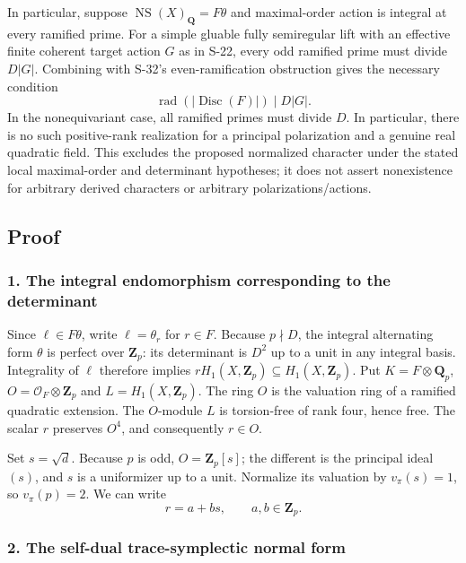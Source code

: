 In particular, suppose \(\operatorname{NS}(X)_{\mathbf Q}=F\theta\) and maximal-order action is integral at every ramified prime. For a simple gluable fully semiregular lift with an effective finite coherent target action \(G\) as in S-22, every odd ramified prime must divide \(D|G|\). Combining with S-32's even-ramification obstruction gives the necessary condition \[
 \operatorname{rad}(|\operatorname{Disc}(F)|)\mid D|G|.
 \tag{S33.4}
\] In the nonequivariant case, all ramified primes must divide \(D\). In particular, there is no such positive-rank realization for a principal polarization and a genuine real quadratic field. This excludes the proposed normalized character under the stated local maximal-order and determinant hypotheses; it does not assert nonexistence for arbitrary derived characters or arbitrary polarizations/actions.

\subsection{Proof}\label{proof}

\subsubsection{1. The integral endomorphism corresponding to the determinant}\label{the-integral-endomorphism-corresponding-to-the-determinant}

Since \(\ell\in F\theta\), write \(\ell=\theta_r\) for \(r\in F\). Because \(p\nmid D\), the integral alternating form \(\theta\) is perfect over \(\mathbf Z_p\): its determinant is \(D^2\) up to a unit in any integral basis. Integrality of \(\ell\) therefore implies \(rH_1(X,\mathbf Z_p)\subseteq H_1(X,\mathbf Z_p)\). Put \(K=F\otimes\mathbf Q_p\), \(O=\mathcal O_F\otimes\mathbf Z_p\) and \(L=H_1(X,\mathbf Z_p)\). The ring \(O\) is the valuation ring of a ramified quadratic extension. The \(O\)-module \(L\) is torsion-free of rank four, hence free. The scalar \(r\) preserves \(O^4\), and consequently \(r\in O\).

Set \(s=\sqrt d\). Because \(p\) is odd, \(O=\mathbf Z_p[s]\); the different is the principal ideal \((s)\), and \(s\) is a uniformizer up to a unit. Normalize its valuation by \(v_\pi(s)=1\), so \(v_\pi(p)=2\). We can write \[
 r=a+bs,\qquad a,b\in\mathbf Z_p.
 \tag{S33.5}
\]

\subsubsection{2. The self-dual trace-symplectic normal form}\label{the-self-dual-trace-symplectic-normal-form}

